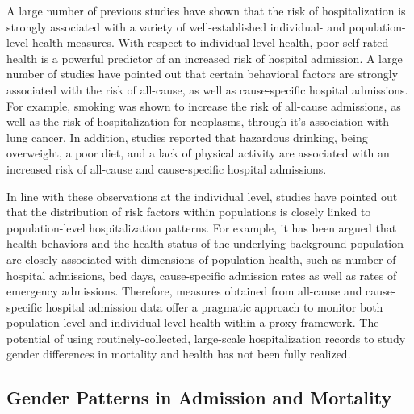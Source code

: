 A large number of previous studies have shown that the risk of hospitalization 
is strongly associated with a variety of well-established individual- 
and population-level health measures. With respect to individual-level 
health, poor self-rated health is a powerful predictor of an increased 
risk of hospital admission.\citep{kennedy2001repeated,desalvo2005predicting} 
A large number of studies have pointed out that certain behavioral 
factors are strongly associated with the risk of all-cause, as well 
as cause-specific hospital admissions. For example, smoking was shown 
to increase the risk of all-cause admissions, as well as the risk of 
hospitalization for neoplasms, through it's association with lung cancer.\citep{hanlon2000link} 
In addition, studies reported that hazardous drinking, being overweight, 
a poor diet, and a lack of physical activity are associated with an increased 
risk of all-cause and cause-specific hospital admissions.\citep{hanlon2007analysis,
smyth2015alcohol,reeves2014hospital,crowe2013risk,garcia2006regular,
syddall2016understanding}

In line with these observations at the individual level, studies have pointed 
out that the distribution of risk factors within populations is closely linked 
to population-level hospitalization patterns.\citep{hanlon2007analysis} 
For example, it has been argued that health behaviors and the health status 
of the underlying background population are closely associated with dimensions 
of population health, such as number of hospital admissions, bed days, 
cause-specific admission rates as well as rates of emergency admissions.\citep{busse2002use,
dixon2004hospital,luben2016predicting,syddall2016understanding,hu2018changes} 
Therefore, measures obtained from all-cause and cause-specific hospital 
admission data offer a pragmatic approach to monitor both population-level 
and individual-level health within a proxy framework. The potential of 
using routinely-collected, large-scale hospitalization records to study 
gender differences in mortality and health has not been fully realized.\\




\subsection{Gender Patterns in Admission and Mortality}

